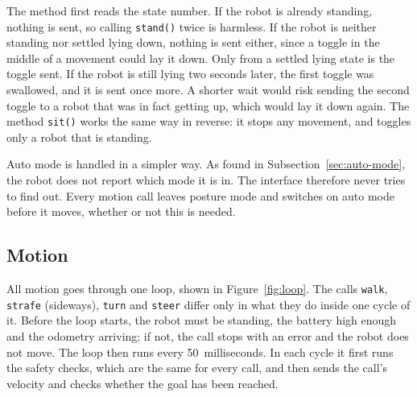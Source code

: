 The method first reads the state number. If the robot is already standing, nothing is sent, so calling
\texttt{stand()} twice is harmless. If the robot is neither standing nor settled lying down, nothing is sent
either, since a toggle in the middle of a movement could lay it down. Only from a settled lying state is the
toggle sent. If the robot is still lying two seconds later, the first toggle was swallowed, and it is sent
once more. A shorter wait would risk sending the second toggle to a robot that was in fact getting up,
which would lay it down again. The method \texttt{sit()} works the same way in reverse: it stops any
movement, and toggles only a robot that is standing.

Auto mode is handled in a simpler way. As found in Subsection~\ref{sec:auto-mode}, the robot does not
report which mode it is in. The interface therefore never tries to find out. Every motion call leaves
posture mode and switches on auto mode before it moves, whether or not this is needed.

\subsection{Motion}
\label{sec:motion}

All motion goes through one loop, shown in Figure~\ref{fig:loop}. The calls \texttt{walk},
\texttt{strafe} (sideways), \texttt{turn} and \texttt{steer} differ only in what they do inside one cycle
of it. Before the loop starts, the robot must be standing, the battery high enough and the odometry
arriving; if not, the call stops with an error and the robot does not move. The loop then runs every
50~milliseconds. In each cycle it first runs the safety checks, which are the same for every call, and then
sends the call's velocity and checks whether the goal has been reached.

